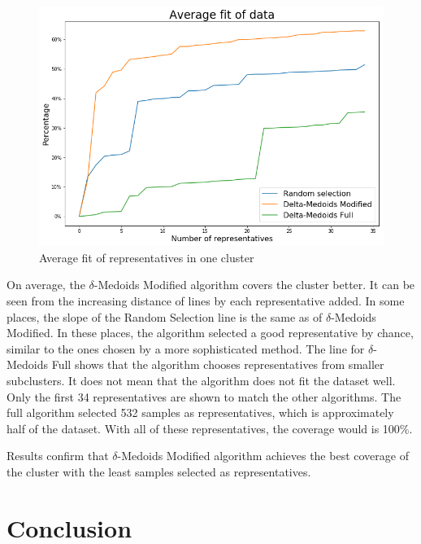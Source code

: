 \documentclass[thesis=B,english]{FITthesis}[2012/10/20]
\begin{document}
\begin{figure}[t]
  \includegraphics[width=\linewidth]{img/exp5.png}
  \caption{Average fit of representatives in one cluster}
  \label{img:exp5}
\end{figure}

On average, the $\delta$-Medoids Modified algorithm covers the cluster better.
It can be seen from the increasing distance of lines by each representative added.
In some places, the slope of the Random Selection line is the same as of $\delta$-Medoids Modified.
In these places, the algorithm selected a good representative by chance, similar to the ones chosen by a more sophisticated method.
The line for $\delta$-Medoids Full shows that the algorithm chooses representatives from smaller subclusters.
It does not mean that the algorithm does not fit the dataset well.
Only the first 34 representatives are shown to match the other algorithms.
The full algorithm selected 532 samples as representatives, which is approximately half of the dataset.
With all of these representatives, the coverage would is 100\%.

Results confirm that $\delta$-Medoids Modified algorithm achieves the best coverage of the cluster with the least samples selected as representatives.



\chapter{Conclusion}
\end{document}
